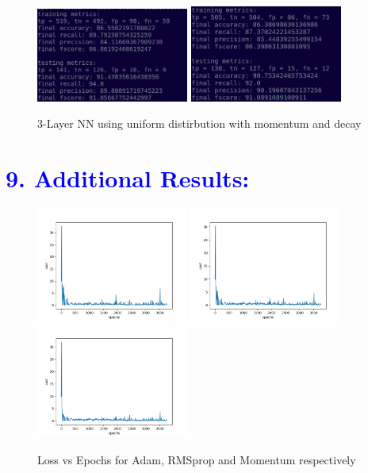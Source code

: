 \documentclass[a4paper,10pt,twocolumn]{article}
\begin{document}
\begin{figure}[h!]
\centering
\includegraphics[scale=1.0, width=5cm]{Fig9.png}
\includegraphics[scale=1.0, width=5cm]{Fig10.png}
\caption*{3-Layer NN using uniform distirbution with momentum and decay}
\end{figure}


\newpage
\onecolumn
\section*{\textcolor{blue}{9. Additional Results:}}
\begin{figure}[h!]
\centering
\includegraphics[scale=1.0, width=5cm]{Fig31_Adam.png}
\includegraphics[scale=1.0, width=5cm]{Fig32_RMSprop.png}
\includegraphics[scale=1.0, width=5cm]{Fig33_SGD_momentum.png}
\caption*{Loss vs Epochs for Adam, RMSprop and Momentum respectively}
\end{figure}
\end{document}
